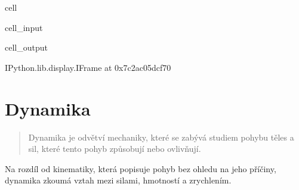 \documentclass[letterpaper,10pt,english]{jupyterBook}
\begin{document}
\begin{sphinxuseclass}{cell}\begin{sphinxVerbatimInput}

\begin{sphinxuseclass}{cell_input}
\begin{sphinxVerbatim}[commandchars=\\\{\}]
   
   
\end{sphinxVerbatim}

\end{sphinxuseclass}\end{sphinxVerbatimInput}
\begin{sphinxVerbatimOutput}

\begin{sphinxuseclass}{cell_output}
\begin{sphinxVerbatim}[commandchars=\\\{\}]
\PYGZlt{}IPython.lib.display.IFrame at 0x7c2ac05dcf70\PYGZgt{}
\end{sphinxVerbatim}

\end{sphinxuseclass}\end{sphinxVerbatimOutput}

\end{sphinxuseclass}
\sphinxstepscope


\section{Dynamika}
\label{\detokenize{Prednasky/1_3_Dynamika_pohybu_v_1D:dynamika}}\label{\detokenize{Prednasky/1_3_Dynamika_pohybu_v_1D::doc}}\begin{quote}

\sphinxAtStartPar
Dynamika je odvětví mechaniky, které se zabývá studiem pohybu těles a sil, které tento pohyb způsobují nebo ovlivňují.
\end{quote}

\sphinxAtStartPar
Na rozdíl od kinematiky, která popisuje pohyb bez ohledu na jeho příčiny, dynamika zkoumá vztah mezi silami, hmotností a zrychlením.
\end{document}
